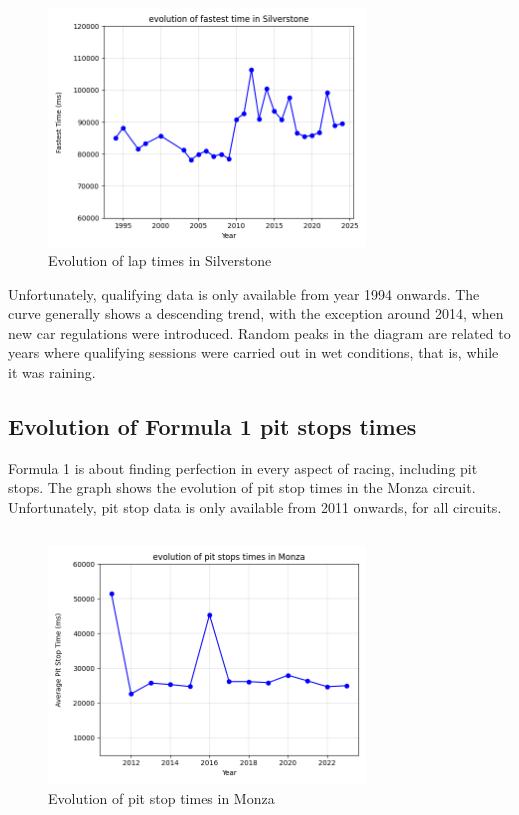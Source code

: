\documentclass{Configuration_Files/PoliMi3i_thesis}
\begin{document}
\begin{figure}[!h]
  \centering
  \includegraphics[width=0.75\textwidth]{latex/formula1/visualization/query5.png}
  \caption{Evolution of lap times in Silverstone}
  \label{fig:releases}
\end{figure}

Unfortunately, qualifying data is only available from year 1994 onwards. The curve generally shows a descending trend, with the exception around 2014, when new car regulations were introduced. Random peaks in the diagram are related to years where qualifying sessions were carried out in wet conditions, that is, while it was raining.


\subsection{Evolution of Formula 1 pit stops times}
Formula 1 is about finding perfection in every aspect of racing, including pit stops. The graph shows the evolution of pit stop times in the Monza circuit. Unfortunately, pit stop data is only available from 2011 onwards, for all circuits.

\vspace{0.5cm}
\inputminted[frame=single,framesep=10pt,breaklines]{python}{formula1/queries/query6.py}

\begin{figure}[!h]
  \centering
  \includegraphics[width=0.75\textwidth]{latex/formula1/visualization/query6.png}
  \caption{Evolution of pit stop times in Monza}
  \label{fig:releases}
\end{figure}
\end{document}
